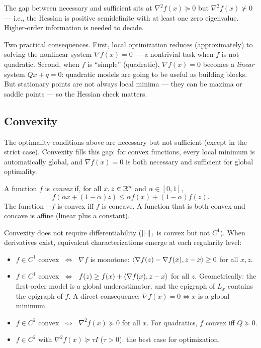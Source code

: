 The gap between necessary and sufficient sits at $\nabla^2 f(x) \succeq 0$ but $\nabla^2 f(x) \not\succ 0$ --- i.e., the Hessian is positive semidefinite with at least one zero eigenvalue.
Higher-order information is needed to decide.

Two practical consequences.
First, local optimization reduces (approximately) to solving the nonlinear system $\nabla f(x) = 0$ --- a nontrivial task when $f$ is not quadratic.
Second, when $f$ is ``simple'' (quadratic), $\nabla f(x) = 0$ becomes a \textit{linear} system $Qx + q = 0$: quadratic models are going to be useful as building blocks.
But stationary points are not always local minima --- they can be maxima or saddle points --- so the Hessian check matters.


\subsection{Convexity}\label{ssec:convexity}

The optimality conditions above are necessary but not sufficient (except in the strict case).
Convexity fills this gap: for convex functions, every local minimum is automatically global, and $\nabla f(x) = 0$ is both necessary and sufficient for global optimality.

\begin{defn}\label{def:convex}
	A function $f$ is \textit{convex} if, for all $x, z \in \mathbb{R}^n$ and $\alpha \in [0,1]$,
	\begin{equation}\label{eq:convexity}
		f(\alpha x + (1 - \alpha) z) \leq \alpha f(x) + (1 - \alpha) f(z).
	\end{equation}
	The function $-f$ is convex iff $f$ is concave.
	A function that is both convex and concave is affine (linear plus a constant).
\end{defn}

Convexity does not require differentiability ($\lVert\cdot\rVert_1$ is convex but not $C^1$).
When derivatives exist, equivalent characterizations emerge at each regularity level:

\begin{itemize}
	\item $f \in C^1$ convex $\;\Leftrightarrow\;$ $\nabla f$ is monotone: $\langle\nabla f(z) - \nabla f(x), z - x\rangle \geq 0$ for all $x, z$.
	\item $f \in C^1$ convex $\;\Leftrightarrow\;$ $f(z) \geq f(x) + \langle\nabla f(x), z - x\rangle$ for all $z$.
		Geometrically: the first-order model is a global underestimator, and the epigraph of $L_x$ contains the epigraph of $f$.
		A direct consequence: $\nabla f(x) = 0 \Leftrightarrow x$ is a global minimum.
	\item $f \in C^2$ convex $\;\Leftrightarrow\;$ $\nabla^2 f(x) \succeq 0$ for all $x$.
		For quadratics, $f$ convex iff $Q \succeq 0$.
	\item $f \in C^2$ with $\nabla^2 f(x) \succeq \tau I$ ($\tau > 0$): the best case for optimization.
\end{itemize}


